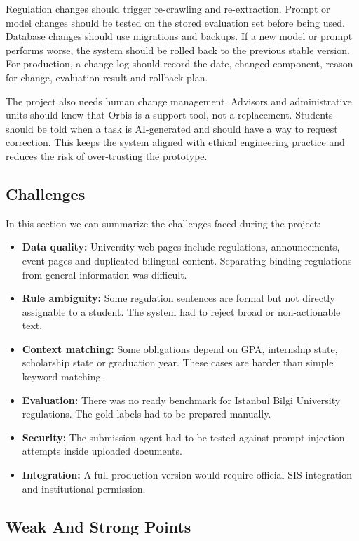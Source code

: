 \documentclass[a4paper,12pt]{article}
\begin{document}
Regulation changes should trigger re-crawling and re-extraction. Prompt or model changes should be tested on the stored evaluation set before being used. Database changes should use migrations and backups. If a new model or prompt performs worse, the system should be rolled back to the previous stable version. For production, a change log should record the date, changed component, reason for change, evaluation result and rollback plan.

The project also needs human change management. Advisors and administrative units should know that Orbis is a support tool, not a replacement. Students should be told when a task is AI-generated and should have a way to request correction. This keeps the system aligned with ethical engineering practice and reduces the risk of over-trusting the prototype.

\subsection{Challenges}
In this section we can summarize the challenges faced during the project:

\begin{itemize}
    \item \textbf{Data quality:} University web pages include regulations, announcements, event pages and duplicated bilingual content. Separating binding regulations from general information was difficult.
    \item \textbf{Rule ambiguity:} Some regulation sentences are formal but not directly assignable to a student. The system had to reject broad or non-actionable text.
    \item \textbf{Context matching:} Some obligations depend on GPA, internship state, scholarship state or graduation year. These cases are harder than simple keyword matching.
    \item \textbf{Evaluation:} There was no ready benchmark for Istanbul Bilgi University regulations. The gold labels had to be prepared manually.
    \item \textbf{Security:} The submission agent had to be tested against prompt-injection attempts inside uploaded documents.
    \item \textbf{Integration:} A full production version would require official SIS integration and institutional permission.
\end{itemize}

\subsection{Weak And Strong Points}
\end{document}
